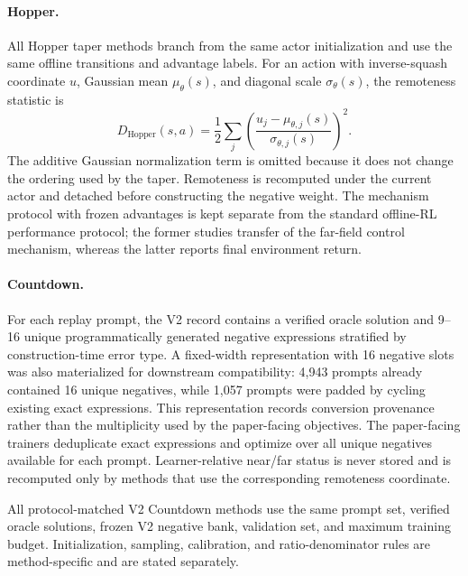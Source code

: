 \documentclass{article}
\theoremstyle{plain}
\theoremstyle{definition}
\theoremstyle{remark}
\begin{document}
\paragraph{Hopper.}
All Hopper taper methods branch from the same actor initialization and
use the same offline transitions and advantage labels. For an action
with inverse-squash coordinate $u$, Gaussian mean $\mu_\theta(s)$, and
diagonal scale $\sigma_\theta(s)$, the remoteness statistic is
\begin{equation}
    D_{\mathrm{Hopper}}(s,a)
    =
    \frac{1}{2}
    \sum_j
    \left(
        \frac{
            u_j-\mu_{\theta,j}(s)
        }{
            \sigma_{\theta,j}(s)
        }
    \right)^2.
    \label{eq:hopper_taper_remoteness}
\end{equation}
The additive Gaussian normalization term is omitted because it does not
change the ordering used by the taper. Remoteness is recomputed under
the current actor and detached before constructing the negative weight.
The mechanism protocol with frozen advantages is kept separate from the
standard offline-RL performance protocol; the former studies transfer of
the far-field control mechanism, whereas the latter reports final
environment return.

\paragraph{Countdown.}
For each replay prompt, the V2 record contains a verified oracle
solution and 9--16 unique programmatically generated negative
expressions stratified by construction-time error type. A fixed-width
representation with 16 negative slots was also materialized for
downstream compatibility: 4{,}943 prompts already contained 16 unique
negatives, while 1{,}057 prompts were padded by cycling existing exact
expressions. This representation records conversion provenance rather
than the multiplicity used by the paper-facing objectives. The
paper-facing trainers deduplicate exact expressions and optimize over
all unique negatives available for each prompt. Learner-relative
near/far status is never stored and is recomputed only by methods that
use the corresponding remoteness coordinate.

All protocol-matched V2 Countdown methods use the same prompt set,
verified oracle solutions, frozen V2 negative bank, validation set,
and maximum training budget. Initialization, sampling, calibration,
and ratio-denominator rules are method-specific and are stated
separately.
\end{document}
